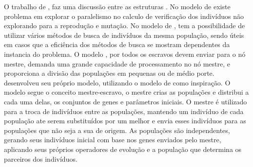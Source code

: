 O trabalho de \cite{Vilson}, faz uma discussão entre as estruturas \cite{Jason}\cite{Alaoui}\cite{Heinz}. No modelo de \cite{Jason} existe problema em explorar o paralelismo no calculo de verificação dos indivíduos não explorando para a reprodução e mutação. No modelo de \cite{Heinz}, tem a possibilidade de utilizar vários métodos de busca de indivíduos da mesma população, sendo úteis em casos que a eficiência dos métodos de busca se mostram dependentes da instancia do problema. O modelo \cite{Alaoui}, por todos os escravos devem enviar para o nó mestre, demanda uma grande capacidade de processamento no nó mestre, e proporciona a divisão das populações em pequenas ou de médio porte. \cite{Vilson} desenvolveu seu próprio modelo, utilizando o modelo de \cite{Alaoui} como inspiração. O modelo segue o conceito mestre-escravo, o mestre crias as populações e distribui a cada uma delas, os conjuntos de genes e parâmetros iniciais. O mestre é utilizado para a troca de indivíduos entre as populações, mantendo um indivíduo de cada população ate serem substituídos por um melhor e envia esses indivíduos para as populações que não seja a sua de origem. As populações são independentes, gerando seus indivíduos inicial com base nos genes enviados pelo mestre, aplicando seus próprios operadores de evolução e a população que determina os parceiros dos indivíduos.